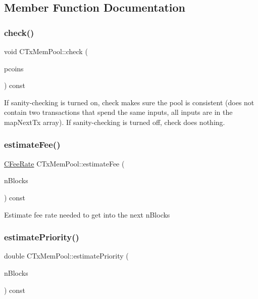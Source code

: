 \subsection{Member Function Documentation}
\mbox{\label{class_c_tx_mem_pool_ab30fadfa811829e79accca41da6a8328}} 
\subsubsection{\texorpdfstring{check()}{check()}}
{\footnotesize\ttfamily void C\+Tx\+Mem\+Pool\+::check (\begin{DoxyParamCaption}\item[{const \mbox{\hyperlink{class_c_coins_view_cache}{C\+Coins\+View\+Cache}} $\ast$}]{pcoins }\end{DoxyParamCaption}) const}

If sanity-\/checking is turned on, check makes sure the pool is consistent (does not contain two transactions that spend the same inputs, all inputs are in the map\+Next\+Tx array). If sanity-\/checking is turned off, check does nothing. \mbox{\label{class_c_tx_mem_pool_a32dd66c128330aed86865c8a61857c6c}} 
\subsubsection{\texorpdfstring{estimateFee()}{estimateFee()}}
{\footnotesize\ttfamily \mbox{\hyperlink{class_c_fee_rate}{C\+Fee\+Rate}} C\+Tx\+Mem\+Pool\+::estimate\+Fee (\begin{DoxyParamCaption}\item[{int}]{n\+Blocks }\end{DoxyParamCaption}) const}

Estimate fee rate needed to get into the next n\+Blocks \mbox{\label{class_c_tx_mem_pool_a225378304025c093d2dc5fcb754ade3b}} 
\subsubsection{\texorpdfstring{estimatePriority()}{estimatePriority()}}
{\footnotesize\ttfamily double C\+Tx\+Mem\+Pool\+::estimate\+Priority (\begin{DoxyParamCaption}\item[{int}]{n\+Blocks }\end{DoxyParamCaption}) const}

